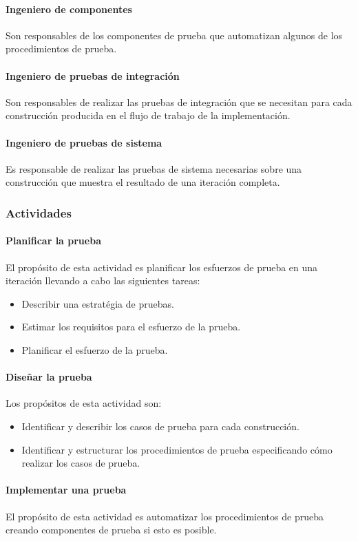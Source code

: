 \paragraph{Ingeniero de componentes}
Son responsables de los componentes de prueba que automatizan algunos de los procedimientos de prueba.
\paragraph{Ingeniero de pruebas de integración}
Son responsables de realizar las pruebas de  integración que se necesitan para cada construcción producida en el flujo de trabajo de la implementación.
\paragraph{Ingeniero de pruebas de sistema}
Es responsable de realizar las pruebas de sistema necesarias sobre una construcción que muestra el resultado de una iteración completa.
\subsubsection{Actividades}
\paragraph{Planificar la prueba}
El propósito de esta actividad es planificar los esfuerzos de prueba en una iteración llevando a cabo las siguientes tareas:
\begin{itemize}
	\item Describir una estratégia de pruebas.
	\item Estimar los requisitos para el esfuerzo de la prueba.
	\item Planificar el esfuerzo de la prueba.
\end{itemize}
\paragraph{Diseñar la prueba}
Los propósitos de esta actividad son:
\begin{itemize}
	\item Identificar y describir los casos de prueba para cada construcción.
	\item Identificar y estructurar los procedimientos de prueba especificando cómo realizar los casos de prueba.
\end{itemize}
\paragraph{Implementar una prueba}
El propósito de esta actividad es automatizar los procedimientos de prueba creando componentes de prueba si esto es posible.
